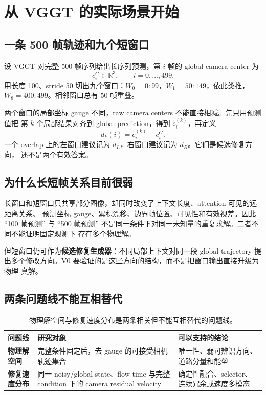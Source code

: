 \documentclass[UTF8,a4paper,11pt]{ctexart}
\begin{document}
\section{从 VGGT 的实际场景开始}

\subsection{一条 500 帧轨迹和九个短窗口}

设 VGGT 对完整 500 帧序列给出长序列预测，第 $i$ 帧的 global camera center 为
\begin{equation}
  c_i^G\in\mathbb R^3,\qquad i=0,\ldots,499.
\end{equation}
用长度 100、stride 50 切出九个窗口：$W_0=0{:}99$，$W_1=50{:}149$，依此类推，
$W_8=400{:}499$。相邻窗口总有 50 帧重叠。

两个窗口的局部坐标 gauge 不同，raw camera centers 不能直接相减。先只用预测值把
第 $k$ 个局部结果对齐到 global prediction，得到 $\widetilde c_i^{(k)}$，再定义
\begin{equation}
  d_k(i)=\widetilde c_i^{(k)}-c_i^G.
  \label{eq:local-residual}
\end{equation}
一个 overlap 上的左窗口建议记为 $d_L$，右窗口建议记为 $d_R$。它们是候选修复方向，
还不是两个有效答案。

\subsection{为什么长短帧关系目前很弱}

长窗口和短窗口只共享部分图像，却同时改变了上下文长度、attention 可见的远距离关系、
预测坐标 gauge、累积漂移、边界帧位置、可见性和有效视差。因此 ``100 帧预测'' 与
``500 帧预测'' 不是同一条件下对同一未知量的重复求解。二者不同不能证明固定观测下
存在多个物理解。

但短窗口仍可作为\textbf{候选修复生成器}：不同局部上下文对同一段 global trajectory
提出多个修改方向。V0 要验证的是这些方向的结构，而不是把窗口输出直接升级为物理
真解。

\subsection{两条问题线不能互相替代}

\begin{table}[htbp]
  \centering
  \small
  \begin{tabularx}{\textwidth}{>{\bfseries}p{2.6cm}X X}
    \toprule
    问题线 & 研究对象 & 可以支持的结论 \\
    \midrule
    物理解空间 & 完整条件固定后，去 gauge 的可接受相机轨迹集合
      & 唯一性、弱可辨识方向、道路分量和能垒 \\
    修复速度分布 & 同一 noisy/global state、flow time 与完整 condition 下的 camera residual velocity
      & 确定性融合、selector、连续冗余或速度多模态 \\
    \bottomrule
  \end{tabularx}
  \caption{物理解空间与修复速度分布是两条相关但不能互相替代的问题线。}
\end{table}
\end{document}
